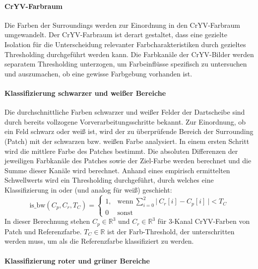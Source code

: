 \paragraph{CrYV-Farbraum}

Die Farben der Surroundings werden zur Einordnung in den CrYV-Farbraum umgewandelt. Der CrYV-Farbraum ist derart gestaltet, dass eine gezielte Isolation für die Unterscheidung relevanter Farbcharakteristiken durch gezieltes Thresholding durchgeführt werden kann. Die Farbkanäle der CrYV-Bilder werden separatem Thresholding unterzogen, um Farbeinflüsse spezifisch zu untersuchen und auszumachen, ob eine gewisse Farbgebung vorhanden ist.

\paragraph{Klassifizierung schwarzer und weißer Bereiche}

Die durchschnittliche Farben schwarzer und weißer Felder der Dartscheibe sind durch bereits vollzogene Vorverarbeitungsschritte bekannt. Zur Einordnung, ob ein Feld schwarz oder weiß ist, wird der zu überprüfende Bereich der Surrounding (Patch) mit der schwarzen bzw. weißen Farbe analysiert. In einem ersten Schritt wird die mittlere Farbe des Patches bestimmt. Die absoluten Differenzen der jeweiligen Farbkanäle des Patches sowie der Ziel-Farbe werden berechnet und die Summe dieser Kanäle wird berechnet. Anhand eines empirisch ermittelten Schwellwerts wird ein Thresholding durchgeführt, durch welches eine Klassifizierung in  oder  (und analog für weiß) geschieht:
\begin{equation*}
    \text{is\_bw}(C_p, C_r, T_C) =
    \begin{cases}
        1, & \text{wenn} ~\sum_{i=0}^{2} \vert~ C_r[i] - C_p[i] ~\vert < T_C \\
        0  & \text{sonst}
    \end{cases}
\end{equation*}
In dieser Berechnung stehen $C_p \in \mathbb{R}^3$ und $C_r \in \mathbb{R}^3$ für 3-Kanal CrYV-Farben von Patch und Referenzfarbe. $T_C \in \mathbb{R}$ ist der Farb-Threshold, der unterschritten werden muss, um als die Referenzfarbe klassifiziert zu werden.

\paragraph{Klassifizierung roter und grüner Bereiche}

